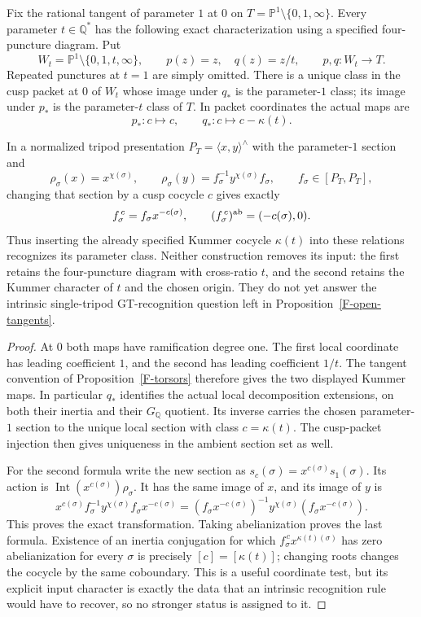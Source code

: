 \begin{proposition}
\label{F-tangent-transport}
Fix the rational tangent of parameter $1$ at $0$ on
$T=\mathbb P^1\setminus\{0,1,\infty\}$. Every parameter
$t\in\mathbb Q^*$ has the following exact characterization
using a specified four-puncture diagram. Put
\[
 W_t=\mathbb P^1\setminus\{0,1,t,\infty\},\qquad
 p(z)=z,\quad q(z)=z/t,
 \qquad p,q:W_t\longrightarrow T.
\]
Repeated punctures at $t=1$ are simply omitted. There is a
unique class in the cusp packet at $0$ of $W_t$ whose image
under $q_*$ is the parameter-$1$ class; its image under
$p_*$ is the parameter-$t$ class of $T$. In packet
coordinates the actual maps are
\[
 p_*:c\longmapsto c,\qquad
 q_*:c\longmapsto c-\kappa(t).
\]

In a normalized tripod presentation
$P_T=\langle x,y\rangle^{\wedge}$ with the parameter-$1$
section and
\[
 \rho_\sigma(x)=x^{\chi(\sigma)},\qquad
 \rho_\sigma(y)=f_\sigma^{-1}y^{\chi(\sigma)}f_\sigma,
 \qquad f_\sigma\in[P_T,P_T],
\]
changing that section by a cusp cocycle $c$ gives exactly
\[
 f^{\,c}_\sigma=f_\sigma x^{-c(\sigma)},\qquad
 (f^{\,c}_\sigma)^{\rm ab}=(-c(\sigma),0).
\]
Thus inserting the already specified Kummer cocycle
$\kappa(t)$ into these relations recognizes its parameter
class. Neither construction removes its input: the first
retains the four-puncture diagram with cross-ratio $t$, and
the second retains the Kummer character of $t$ and the
chosen origin. They do not yet answer the intrinsic
single-tripod GT-recognition question left in
Proposition~\ref{F-open-tangents}.
\end{proposition}
\begin{proof}
At $0$ both maps have ramification degree one. The first local
coordinate has leading coefficient $1$, and the second has
leading coefficient $1/t$. The tangent convention of
Proposition~\ref{F-torsors} therefore gives the two displayed
Kummer maps. In particular $q_*$ identifies the actual local
decomposition extensions, on both their inertia and their
$G_{\mathbb Q}$ quotient. Its inverse carries the chosen
parameter-$1$ section to the unique local section with class
$c=\kappa(t)$. The cusp-packet injection then gives uniqueness
in the ambient section set as well.

For the second formula write the new section as
$s_c(\sigma)=x^{c(\sigma)}s_1(\sigma)$. Its action is
$\operatorname{Int}(x^{c(\sigma)})\rho_\sigma$. It has the
same image of $x$, and its image of $y$ is
\[
 x^{c(\sigma)}f_\sigma^{-1}y^{\chi(\sigma)}
                   f_\sigma x^{-c(\sigma)}
 = (f_\sigma x^{-c(\sigma)})^{-1}y^{\chi(\sigma)}
                   (f_\sigma x^{-c(\sigma)}).
\]
This proves the exact transformation. Taking abelianization
proves the last formula. Existence of an inertia conjugation
for which $f^{\,c}_\sigma x^{\kappa(t)(\sigma)}$ has zero
abelianization for every $\sigma$ is precisely
$[c]=[\kappa(t)]$; changing roots changes the cocycle by the
same coboundary. This is a useful coordinate test, but its
explicit input character is exactly the data that an intrinsic
recognition rule would have to recover, so no stronger status
is assigned to it.
\end{proof}

